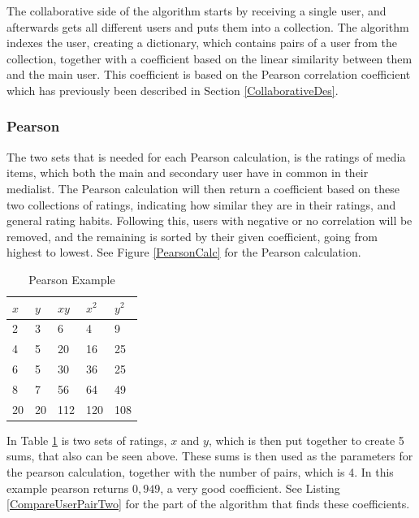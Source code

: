 The collaborative side of the algorithm starts by receiving a single user, and afterwards gets all different users and puts them into a collection. The algorithm indexes the user, creating a dictionary, which contains pairs of a user from the collection, together with a coefficient based on the linear similarity between them and the main user. This coefficient is based on the Pearson correlation coefficient which has previously been described in Section \ref{CollaborativeDes}.

\subsubsection{Pearson}

The two sets that is needed for each Pearson calculation, is the ratings of media items, which both the main and secondary user have in common in their medialist. The Pearson calculation will then return a coefficient based on these two collections of ratings, indicating how similar they are in their ratings, and general rating habits. Following this, users with negative or no correlation will be removed, and the remaining is sorted by their given coefficient, going from highest to lowest. See Figure \ref{PearsonCalc} for the Pearson calculation.

\begin{table}[htb]
\centering
\begin{tabular}{|l|l|l|l|l|} \hline
	\textbf{$x$} & \textbf{$y$} & \textbf{$xy$}
	& \textbf{$x^2$} & \textbf{$y^2$} \\ \hline
	2 & 3 & 6 & 4 & 9 \\ \hline
	4 & 5 & 20 & 16 & 25 \\ \hline
	6 & 5 & 30 & 36 & 25 \\ \hline
	8 & 7 & 56 & 64 & 49 \\ \hline\hline
	20 & 20 & 112 & 120 & 108 \\ \hline
\end{tabular}
\caption{Pearson Example}
\label{PearsonEx}
\end{table} 

In Table \ref{PearsonEx} is two sets of ratings, $x$ and $y$, which is then put together to create 5 sums, that also can be seen above. These sums is then used as the parameters for the pearson calculation, together with the number of pairs, which is 4. In this example pearson returns $0,949$, a very good coefficient. See Listing \ref{CompareUserPairTwo} for the part of the algorithm that finds these coefficients.

